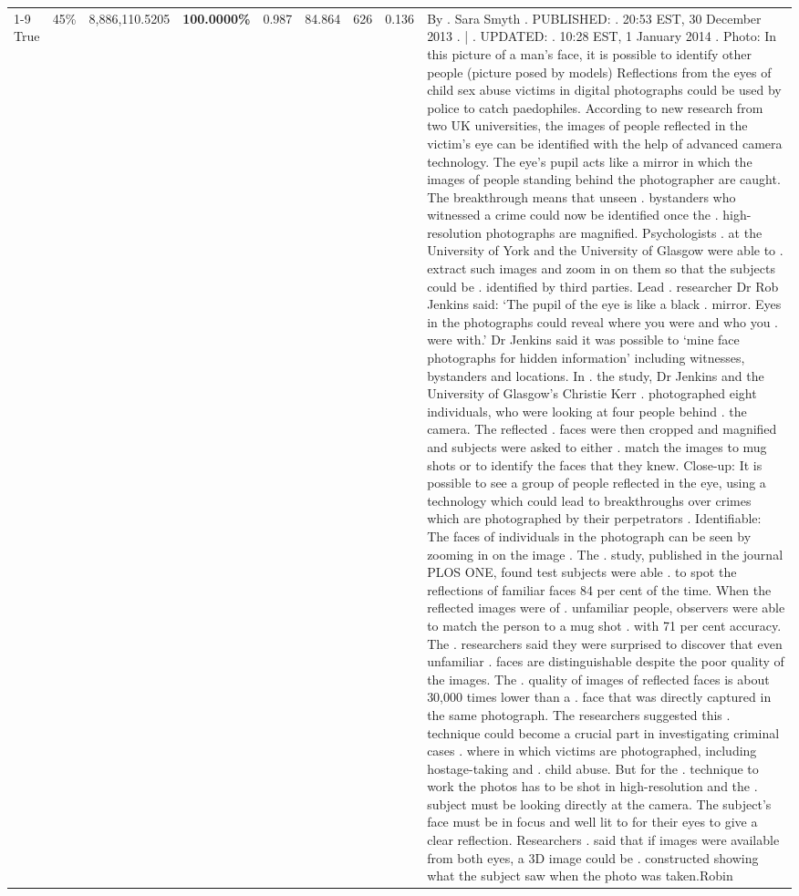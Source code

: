 \begin{table}[H]
\begin{tabular}{lllrlllll}
\cline{1-9} \cline{2-9}
True & 45\% & 8,886,110.5205 & \bfseries \color{red} 100.0000\% & 0.987 & 84.864 & 626 & 0.136 & By . Sara Smyth . PUBLISHED: . 20:53 EST, 30 December 2013 . | . UPDATED: . 10:28 EST, 1 January 2014 . Photo: In this picture of a man's face, it is possible to identify other people (picture posed by models) Reflections from the eyes of child sex abuse victims in digital photographs could be used by police to catch paedophiles. According to new research from two UK universities, the images of people reflected in the victim's eye can be identified with the help of advanced camera technology. The eye's pupil acts like a mirror in which the images of people standing behind the photographer are caught. The breakthrough means that unseen . bystanders who witnessed a crime could now be identified once the . high-resolution photographs are magnified. Psychologists . at the University of York and the University of Glasgow were able to . extract such images and zoom in on them so that the subjects could be . identified by third parties. Lead . researcher Dr Rob Jenkins said: ‘The pupil of the eye is like a black . mirror. Eyes in the photographs could reveal where you were and who you . were with.' Dr Jenkins said it was possible to ‘mine face photographs for hidden information' including witnesses, bystanders and locations. In . the study, Dr Jenkins and the University of Glasgow's Christie Kerr . photographed eight individuals, who were looking at four people behind . the camera. The reflected . faces were then cropped and magnified and subjects were asked to either . match the images to mug shots or to identify the faces that they knew. Close-up: It is possible to see a group of people reflected in the eye, using a technology which could lead to breakthroughs over crimes which are photographed by their perpetrators . Identifiable: The faces of individuals in the photograph can be seen by zooming in on the image . The . study, published in the journal PLOS ONE, found test subjects were able . to spot the reflections of familiar faces 84 per cent of the time. When the reflected images were of . unfamiliar people, observers were able to match the person to a mug shot . with 71 per cent accuracy. The . researchers said they were surprised to discover that even unfamiliar . faces are distinguishable despite the poor quality of the images. The . quality of images of reflected faces is about 30,000 times lower than a . face that was directly captured in the same photograph. The researchers suggested this . technique could become a crucial part in investigating criminal cases . where in which victims are photographed, including hostage-taking and . child abuse. But for the . technique to work the photos has to be shot in high-resolution and the . subject must be looking directly at the camera. The subject's face must be in focus and well lit to for their eyes to give a clear reflection. Researchers . said that if images were available from both eyes, a 3D image could be . constructed showing what the subject saw when the photo was taken.Robin \\

\end{tabular}
\end{table}
